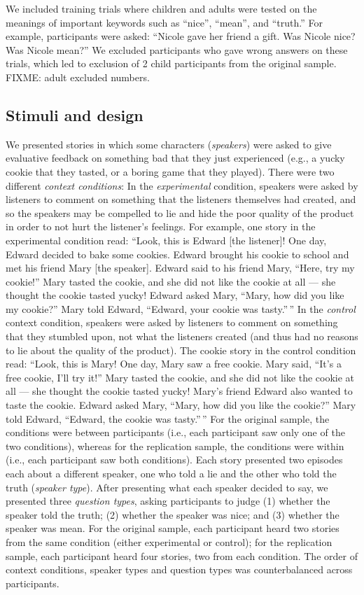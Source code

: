 \documentclass[oneside]{report}
\begin{document}
We included training trials where children and adults were tested on the
meanings of important keywords such as ``nice'', ``mean'', and
``truth.'' For example, participants were asked: ``Nicole gave her
friend a gift. Was Nicole nice? Was Nicole mean?'' We excluded
participants who gave wrong answers on these trials, which led to
exclusion of 2 child participants from the original sample. FIXME: adult
excluded numbers.

\subsection{Stimuli and design}\label{stimuli-and-design-2}

We presented stories in which some characters (\emph{speakers}) were
asked to give evaluative feedback on something bad that they just
experienced (e.g., a yucky cookie that they tasted, or a boring game
that they played). There were two different \emph{context conditions}:
In the \emph{experimental} condition, speakers were asked by listeners
to comment on something that the listeners themselves had created, and
so the speakers may be compelled to lie and hide the poor quality of the
product in order to not hurt the listener's feelings. For example, one
story in the experimental condition read: ``Look, this is Edward {[}the
listener{]}! One day, Edward decided to bake some cookies. Edward
brought his cookie to school and met his friend Mary {[}the speaker{]}.
Edward said to his friend Mary, ``Here, try my cookie!'' Mary tasted the
cookie, and she did not like the cookie at all --- she thought the
cookie tasted yucky! Edward asked Mary, ``Mary, how did you like my
cookie?'' Mary told Edward, ``Edward, your cookie was tasty.''\,'' In
the \emph{control} context condition, speakers were asked by listeners
to comment on something that they stumbled upon, not what the listeners
created (and thus had no reasons to lie about the quality of the
product). The cookie story in the control condition read: ``Look, this
is Mary! One day, Mary saw a free cookie. Mary said, ``It's a free
cookie, I'll try it!'' Mary tasted the cookie, and she did not like the
cookie at all --- she thought the cookie tasted yucky! Mary's friend
Edward also wanted to taste the cookie. Edward asked Mary, ``Mary, how
did you like the cookie?'' Mary told Edward, ``Edward, the cookie was
tasty.''\,'' For the original sample, the conditions were between
participants (i.e., each participant saw only one of the two
conditions), whereas for the replication sample, the conditions were
within (i.e., each participant saw both conditions). Each story
presented two episodes each about a different speaker, one who told a
lie and the other who told the truth (\emph{speaker type}). After
presenting what each speaker decided to say, we presented three
\emph{question types}, asking participants to judge (1) whether the
speaker told the truth; (2) whether the speaker was nice; and (3)
whether the speaker was mean. For the original sample, each participant
heard two stories from the same condition (either experimental or
control); for the replication sample, each participant heard four
stories, two from each condition. The order of context conditions,
speaker types and question types was counterbalanced across
participants.
\end{document}
